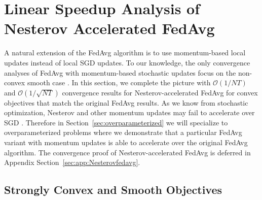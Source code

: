 


\section{Linear Speedup Analysis of Nesterov Accelerated FedAvg}
\label{sec:Nesterov}

A natural extension of the FedAvg algorithm is to use momentum-based
local updates instead of local SGD updates. To our knowledge, the
only convergence analyses of FedAvg with momentum-based stochastic
updates focus on the non-convex smooth case \cite{huo2020faster,yu2019linear,li2018federated}.
In this section, we complete the picture with $\mathcal{O}(1/NT)$
and $\mathcal{O}(1/\sqrt{NT})$ convergence results for Nesterov-accelerated
FedAvg for convex objectives that match the original FedAvg results.
As we know from stochastic optimization, Nesterov and other momentum
updates may fail to accelerate over SGD \cite{liu2018accelerating,kidambi2018insufficiency,liu2018toward,yuan2016influence}.
Therefore in Section~\ref{sec:overparameterized} we will specialize to overparameterized
problems where we demonstrate that a particular FedAvg variant with
momentum updates is able to accelerate over the original FedAvg algorithm. 
The convergence proof of Nesterov-accelerated FedAvg is deferred in Appendix Section~\ref{sec:app:Nesterovfedavg}.

\subsection{Strongly Convex and Smooth Objectives}

